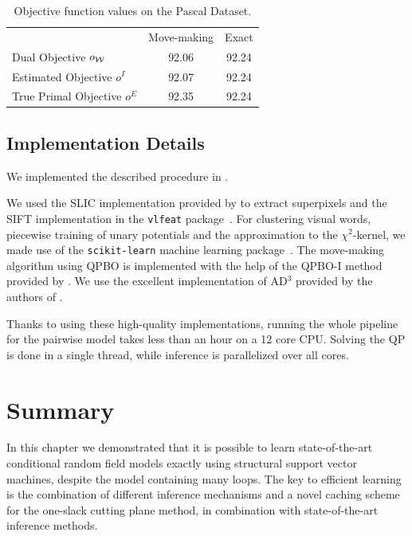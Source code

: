 \begin{table}
    \begin{center}
    \begin{tabularx}{\linewidth}{@{\extracolsep{\fill}}lcc}
    \toprule
                    & Move-making & Exact \\
    \cmidrule{1-3}
    Dual Objective $o_{\mathcal{W}}$ &92.06& 92.24\\
    Estimated Objective $o^I$ & 92.07 &92.24\\
    True Primal Objective $o^E$&92.35& 92.24  \\
    \bottomrule
    \end{tabularx}
    \end{center}
    \caption{Objective function values on the Pascal Dataset.}
\end{table}


\subsection{Implementation Details}
We implemented the described procedure in \pystruct.

We used the SLIC implementation provided by \citet{achanta2012slic} to extract superpixels and
the SIFT implementation in the \texttt{vlfeat} package~\citep{vedaldi08vlfeat}.
For clustering visual words, piecewise training of unary potentials and the
approximation to the $\chi^2$-kernel, we made use of the \texttt{scikit-learn}
machine learning package~\citep{pedregosa2011scikit}.
The move-making algorithm using QPBO is implemented with the help of the QPBO-I
method provided by \citet{rother2007optimizing}.
We use the excellent implementation of AD$^3$ provided by the authors of
\citet{martins2011augmented}. 

Thanks to using these high-quality implementations, running the whole pipeline
for the pairwise model takes less than an hour on a 12 core CPU\@. Solving the
QP is done in a single thread, while inference is parallelized over all cores.
 
\section{Summary}
In this chapter we demonstrated that it is possible to learn state-of-the-art
conditional random field models exactly using structural support vector
machines, despite the model containing many loops.  The key to efficient
learning is the combination of different inference mechanisms and a novel
caching scheme for the one-slack cutting plane method, in combination with
state-of-the-art inference methods.

